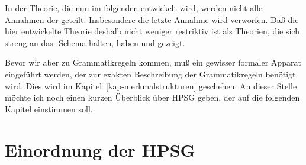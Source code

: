In der Theorie, die nun im folgenden entwickelt wird, werden nicht alle Annahmen
der \xbart geteilt. Insbesondere die letzte Annahme wird verworfen. Daß die
hier entwickelte Theorie deshalb nicht weniger restriktiv ist als Theorien,
die sich streng an das \xbar-Schema halten, haben \citet{Pullum85a} und \citet{KP90a}
gezeigt.

Bevor wir aber zu Grammatikregeln kommen, muß ein gewisser formaler Apparat eingeführt
werden, der zur exakten Beschreibung der Grammatikregeln benötigt wird. Dies wird
im Kapitel~\ref{kap-merkmalstrukturen} geschehen. An dieser Stelle möchte
ich noch einen kurzen Überblick über HPSG geben, der auf die folgenden Kapitel einstimmen soll.





\section{Einordnung der HPSG}
\label{sec-grundlegendes}

